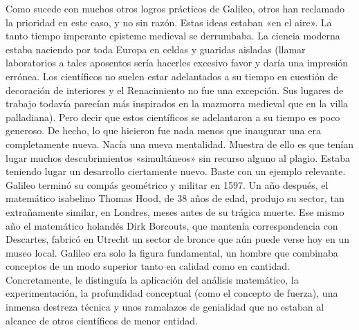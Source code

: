 \documentclass[letterpaper, 10pt, journal]{IEEEtran}
\begin{document}
\newline
Como sucede con muchos otros logros prácticos de Galileo, otros han reclamado la prioridad en este caso, y no sin razón. Estas ideas estaban «en el aire». La tanto tiempo imperante episteme medieval se derrumbaba. La ciencia moderna estaba naciendo por toda Europa en celdas y guaridas aisladas (llamar laboratorios a tales aposentos sería hacerles excesivo favor y daría una impresión errónea. Los científicos no suelen estar adelantados a su tiempo en cuestión de decoración de interiores y el Renacimiento no fue una excepción. Sus lugares de trabajo todavía parecían más inspirados en la mazmorra medieval que en la villa palladiana). Pero decir que estos científicos se adelantaron a su tiempo es poco generoso. De hecho, lo que hicieron fue nada menos que inaugurar una era completamente nueva. Nacía una nueva mentalidad. Muestra de ello es que tenían lugar muchos descubrimientos «simultáneos» sin recurso alguno al plagio. Estaba teniendo lugar un desarrollo ciertamente nuevo. Baste con un ejemplo relevante. Galileo terminó su compás geométrico y militar en 1597. Un año después, el matemático isabelino Thomas Hood, de 38 años de edad, produjo su sector, tan extrañamente similar, en Londres, meses antes de su trágica muerte. Ese mismo año el matemático holandés Dirk Borcouts, que mantenía correspondencia con Descartes, fabricó en Utrecht un sector de bronce que aún puede verse hoy en un museo local.
\newline
Galileo era solo la figura fundamental, un hombre que combinaba conceptos de un modo superior tanto en calidad como en cantidad. Concretamente, le distinguía la aplicación del análisis matemático, la experimentación, la profundidad conceptual (como el concepto de fuerza), una inmensa destreza técnica y unos ramalazos de genialidad que no estaban al alcance de otros científicos de menor entidad. 
\end{document}
